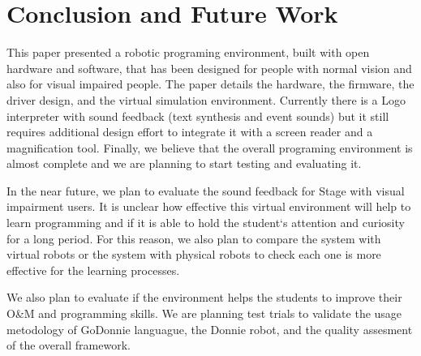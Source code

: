 
\section{Conclusion and Future Work}
\label{sec:conclusion}

This paper presented a robotic programing environment, built with open hardware and software, that has been designed for people with normal vision and also for visual impaired people. The paper details the hardware, the firmware, the driver design, and the virtual simulation environment. Currently there is a Logo interpreter with sound feedback (text synthesis and event sounds) but it still requires additional design effort to integrate it with a screen reader and a magnification tool. Finally, we believe that the overall programing environment is almost complete and we are planning to start testing and evaluating it.

In the near future, we plan to evaluate the sound feedback for Stage with visual impairment users. It is unclear how effective this virtual environment will help to learn programming and if it is able to hold the student`s attention and curiosity for a long period. For this reason, we also plan to compare the system with virtual robots or the system with physical robots to check each one is more effective for the learning processes.

We also plan to evaluate if the environment helps the students to improve their O\&M and programming skills. 
We are planning test trials to validate the usage metodology of GoDonnie languague, the Donnie robot, and the quality assesment of the overall framework. 

